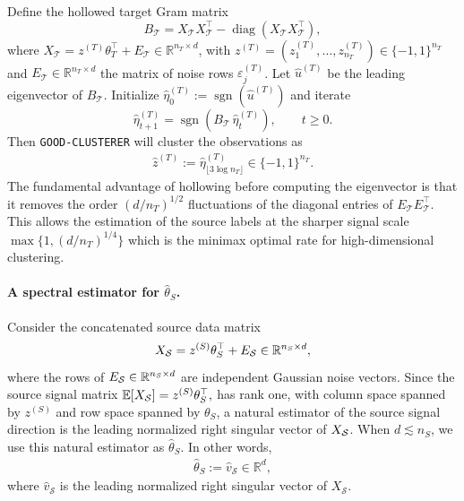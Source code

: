 \documentclass[10pt]{article}
\newcommand{\R}{\mathbb R}
\newcommand{\sgn}{\operatorname{sgn}}
\newcommand{\diag}{\operatorname{diag}}
\newcommand{\wh}{\widehat}
\newcommand{\calT}{\mathcal T}
\newcommand{\trg}{T}
\newcommand{\thetaT}{\theta_{\trg}}
\newcommand{\nT}{n_{\trg}}
\newcommand{\ztar}{z^{(\trg)}}
\newcommand{\hatztar}{\wh{z}^{(\trg)}}
\newcommand{\calS}{\mathcal S}
\newcommand{\src}{S}
\newcommand{\thetaS}{\theta_{\src}}
\newcommand{\nS}{n_{\src}}
\newcommand{\zsrc}{z^{(\src)}}
\newcommand{\hatthetaS}{\wh{\theta}_S}
\begin{document}
Define the hollowed target Gram matrix
\begin{equation}
\label{eq:define_b_cal_t}
    B_{\calT} = X_{\calT} X_{\calT}^\top
    - \diag(X_{\calT} X_{\calT}^\top),
\end{equation}
where $X_{\calT} = \ztar \thetaT^\top + E_{\calT} \in \R^{\nT \times d}$,
with $\ztar = (\ztar_1, \ldots, \ztar_{\nT}) \in \{-1,1\}^{\nT}$ and
$E_{\calT} \in \R^{\nT \times d}$ the matrix of noise rows
$\varepsilon_j^{(\trg)}$.
Let $\wh{u}^{(\trg)}$ be the leading eigenvector of $B_{\calT}$.
Initialize $\wh{\eta}^{(\trg)}_0 := \sgn(\wh{u}^{(\trg)})$ and iterate
\[
    \wh{\eta}^{(\trg)}_{t+1} = \sgn\!\left(B_{\calT}\, \wh{\eta}^{(\trg)}_t\right),
    \qquad t \geq 0.
\]
Then \texttt{GOOD-CLUSTERER} will cluster the observations as
\begin{align}
    \hatztar := \wh{\eta}^{(\trg)}_{\lfloor 3 \log \nT \rfloor}
    \in \{-1, 1\}^{\nT}.
\end{align}
The fundamental advantage of hollowing before computing the eigenvector is that it removes the order $(d/\nT)^{1/2}$ fluctuations of the diagonal entries of $E_{\calT}E_{\calT}^{\top}$. This allows the estimation of the source labels at the sharper signal scale
$\max\{1,(d/\nT)^{1/4}\}$ which is the minimax optimal rate for high-dimensional clustering.

\paragraph{A spectral estimator for $\wh\theta_S$.}
Consider the concatenated source data matrix 
\[
X_{\cal S}=\zsrc\thetaS^\top+E_{\cal S}\in\mathbb R^{\nS\times d},
\]
where the rows of $E_{\cal S} \in \R^{\nS \times d}$ are independent Gaussian noise vectors. Since the source signal matrix $\mathbb E[X_{\cal S}]=\zsrc\thetaS^\top,$ has rank one, with column space spanned by $\zsrc$ and row space spanned by $\thetaS$, a natural estimator of the source signal direction is the leading normalized right singular vector of $X_{\cal S}$. 
When $d\lesssim \nS$, we use this natural estimator as $\wh \theta_S$. In other words,
\begin{align}
    \label{eq:hat_q_i_ld}
    \hatthetaS := \wh{v}_{\calS} \in \R^d,
\end{align}
where $\wh{v}_{\calS}$ is the leading normalized right singular vector of $X_{\calS}$.
\end{document}
